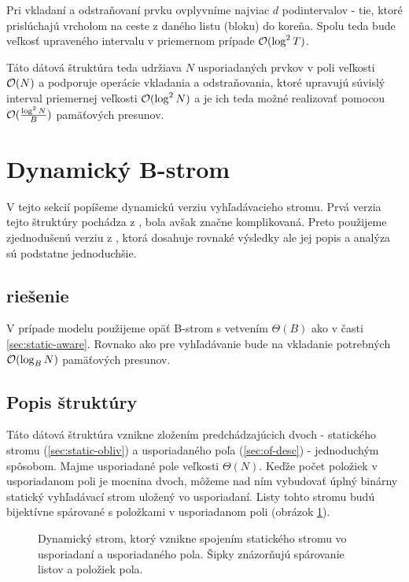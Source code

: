 Pri vkladaní a odstraňovaní prvku ovplyvníme najviac $d$ podintervalov - tie, ktoré prislúchajú vrcholom na ceste z daného listu (bloku) do koreňa. Spolu teda bude veľkosť upraveného intervalu v priemernom prípade $\mathcal{O}(\log^2{T})$.


Táto dátová štruktúra teda udržiava $N$ usporiadaných prvkov v poli veľkosti $\mathcal{O}(N)$ a podporuje operácie vkladania a odstraňovania, ktoré upravujú súvislý interval priemernej veľkosti $\mathcal{O}(\log^2{N})$ a je ich teda možné realizovať pomocou $\mathcal{O}(\frac{\log^2{N}}{B})$ pamäťových presunov.

\section{Dynamický B-strom} \label{sec:dynamic-obliv}
V tejto sekcií popíšeme dynamickú verziu \obliv vyhľadávacieho stromu. Prvá verzia tejto štruktúry pochádza z \citep{btreeshort,btreefull}, bola avšak značne komplikovaná. Preto použijeme zjednodušenú verziu z \citep{bender2002}, ktorá dosahuje rovnaké výsledky ale jej popis a analýza sú podstatne jednoduchšie.

\subsection{\Aware riešenie}
V prípade \aware modelu použijeme opäť B-strom s vetvením $\Theta(B)$ ako v časti \ref{sec:static-aware}. Rovnako ako pre vyhľadávanie bude na vkladanie potrebných $\mathcal{O}(\log_B{N})$ pamäťových presunov.

\subsection{Popis \obliv štruktúry}
Táto dátová štruktúra vznikne zložením predchádzajúcich dvoch - statického stromu (\ref{sec:static-obliv}) a usporiadaného poľa (\ref{sec:of-desc}) - jednoduchým spôsobom. Majme usporiadané pole veľkosti $\Theta(N)$. Keďže počet položiek v usporiadanom poli je mocnina dvoch, môžeme nad ním vybudovať úplný binárny statický vyhľadávací strom uložený vo \vEB usporiadaní. Listy tohto stromu budú bijektívne spárované s položkami v usporiadanom poli (obrázok \ref{fig:cobtree_overview}).

\begin{figure}
    \centering
    \resizebox{\textwidth}{!}{
        
    }
    \caption[Dynamický strom]{Dynamický strom, ktorý vznikne spojením statického stromu vo \vEB usporiadaní a usporiadaného pola. Šipky znázorňujú spárovanie listov a položiek pola.}
    \label{fig:cobtree_overview}
\end{figure}

